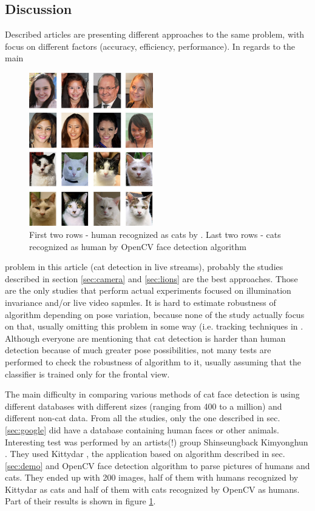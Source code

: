 \documentclass[hyperref]{acmtrans2e}
\begin{document}
\subsection{Discussion}

Described articles are presenting different approaches to the same problem, with focus on different factors (accuracy, efficiency, performance). In regards to the main 
\begin{figure}
\centering
    \includegraphics[width=0.48\textwidth]{cat_vs_human}
\centering
  \caption{First two rows - human recognized as cats by \protect\cite{demo:2013}. Last two rows - cats recognized as human by OpenCV \protect\cite{cv:2015} face detection algorithm}
  \label{fig:cat_vs_human}
\end{figure}
problem in this article (cat detection in live streams), probably the studies described in section \ref{sec:camera} and \ref{sec:lions} are the best approaches. Those are the only studies that perform actual experiments focused on illumination invariance and/or live video sapmles. It is hard to estimate robustness of algorithm depending on pose variation, because none of the study actually focus on that, usually omitting this problem in some way (i.e. tracking techniques in \cite{lions:2006}. Although everyone are mentioning that cat detection is harder than human detection because of much greater pose possibilities, not many tests are performed to check the robustness of algorithm to it, usually assuming that the classifier is trained only for the frontal view.

The main difficulty in comparing various methods of cat face detection is using different databases with different sizes (ranging from 400 to a million) and different non-cat data. From all the studies, only the one described in sec. \ref{sec:google} did have a database containing human faces or other animals. Interesting test was performed by an artists(!) group Shinseungback Kimyonghun \cite{vs:2013}. They used Kittydar \cite{demo:2013}, the application based on algorithm described in sec. \ref{sec:demo} and OpenCV face detection algorithm to parse pictures of humans and cats. They ended up with 200 images, half of them with humans recognized by Kittydar as cats and half of them with cats recognized by OpenCV as humans. Part of their results is shown in figure \ref{fig:cat_vs_human}.
\end{document}
